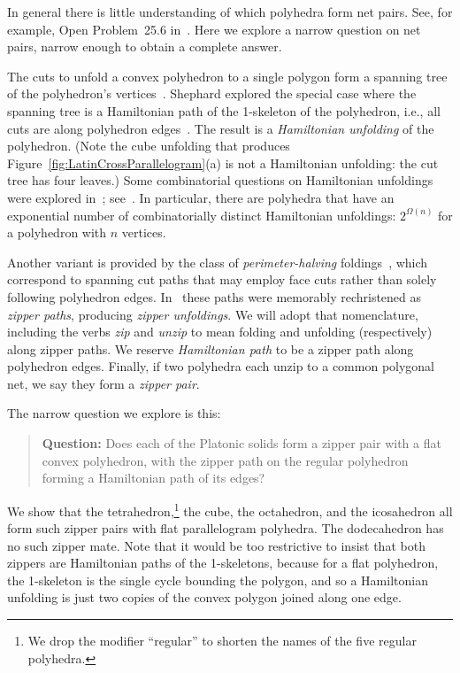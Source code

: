 \pdfoutput=1  \documentclass[]{article}
\newcommand{\figref}[1]{\ref{fig:#1}}
\begin{document}
In general there is little understanding of which polyhedra form net
pairs.
See, for example, Open Problem~25.6 in~\cite{do-gfalop-07}.
Here we explore a narrow question on net pairs,
narrow enough to obtain a complete answer.


The cuts to unfold a convex polyhedron to a single polygon
form a spanning tree of the polyhedron's vertices~\cite[Sec.~22.1.3]{do-gfalop-07}.
Shephard explored the special case where the spanning tree is
a Hamiltonian path of the 1-skeleton of the polyhedron,
i.e., all cuts are along polyhedron edges~\cite{s-cpcn-75}.
The result is a \emph{Hamiltonian unfolding} of the polyhedron.
(Note the cube unfolding that produces
Figure~\figref{LatinCrossParallelogram}(a)
is not a Hamiltonian unfolding: the cut tree has four leaves.)
Some combinatorial questions on Hamiltonian unfoldings were explored in~\cite{ddlo-efupp-02};
see~\cite[Fig.~25.59 ]{do-gfalop-07}.
In particular, there are polyhedra that have an exponential number of
combinatorially distinct Hamiltonian
unfoldings: $2^{\Omega(n)}$ for a polyhedron with $n$ vertices.


Another variant is provided by the class of \emph{perimeter-halving} 
foldings~\cite[Sec.~25.1.2 ]{do-gfalop-07},
which correspond to spanning cut paths that may employ face cuts 
rather than solely following polyhedron edges.
In~\cite{lddss-zupc-10} these paths were memorably rechristened as
\emph{zipper paths}, producing \emph{zipper unfoldings}.
We will adopt that nomenclature, including the verbs \emph{zip} and
\emph{unzip}
to mean folding and unfolding (respectively) along zipper paths.
We reserve \emph{Hamiltonian path} to be a zipper path along
polyhedron edges.
Finally, if two polyhedra each unzip to a common polygonal net,
we say they form a \emph{zipper pair}.

The narrow question we explore is this:
\begin{quotation}
\noindent
\textbf{Question:}
Does each of the Platonic solids form a zipper pair
with a flat convex polyhedron,
with the zipper path on the regular polyhedron forming a Hamiltonian
path of its edges?
\end{quotation}

We show that the tetrahedron,\footnote{
    We drop the modifier ``regular'' to shorten the names of the
    five regular polyhedra.
}
the cube, the octahedron, and the
icosahedron all form such zipper pairs with flat parallelogram
polyhedra.
The dodecahedron has no such zipper mate.
Note that it would be too restrictive to insist that both zippers are
Hamiltonian paths of the 1-skeletons, because
for a flat polyhedron, the 1-skeleton is the single cycle bounding
the polygon, and so a Hamiltonian unfolding is just two 
copies of the convex polygon joined along one edge.
\end{document}
